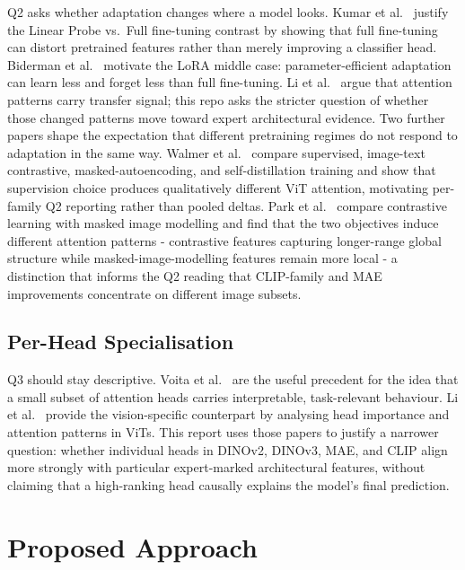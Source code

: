 \documentclass[lineno,pdflatex,sn-mathphys-num]{sn-jnl}%
\theoremstyle{thmstyleone}%
\theoremstyle{thmstyletwo}%
\theoremstyle{thmstylethree}%
\begin{document}
Q2 asks whether adaptation changes where a model looks. Kumar et
al.~\cite{Kumar22Distort} justify the Linear Probe vs.\ Full fine-tuning
contrast by showing that full fine-tuning can distort pretrained features rather
than merely improving a classifier head. Biderman et al.~\cite{Biderman24LoRA}
motivate the LoRA middle case: parameter-efficient adaptation can learn less and
forget less than full fine-tuning. Li et al.~\cite{Li24AttnTransfer} argue that
attention patterns carry transfer signal; this repo asks the stricter question of
whether those changed patterns move toward expert architectural evidence.
Two further papers shape the expectation that different pretraining regimes do
not respond to adaptation in the same way. Walmer et
al.~\cite{Walmer23Teaching} compare supervised, image-text contrastive,
masked-autoencoding, and self-distillation training and show that supervision
choice produces qualitatively different ViT attention, motivating per-family
Q2 reporting rather than pooled deltas. Park et al.~\cite{Park23SSLViT}
compare contrastive learning with masked image modelling and find that the two
objectives induce different attention patterns - contrastive features
capturing longer-range global structure while masked-image-modelling features
remain more local - a distinction that informs the Q2 reading that
CLIP-family and MAE improvements concentrate on different image subsets.

\subsection{Per-Head Specialisation}

Q3 should stay descriptive. Voita et al.~\cite{Voita19Heads} are the useful
precedent for the idea that a small subset of attention heads carries
interpretable, task-relevant behaviour. Li et al.~\cite{Li23HeadDist} provide
the vision-specific counterpart by analysing head importance and attention
patterns in ViTs. This report uses those papers to justify a narrower question:
whether individual heads in DINOv2, DINOv3, MAE, and CLIP align more strongly
with particular expert-marked architectural features, without claiming that a
high-ranking head causally explains the model's final prediction.

\section{Proposed Approach}
\label{sec:approach}
\end{document}
